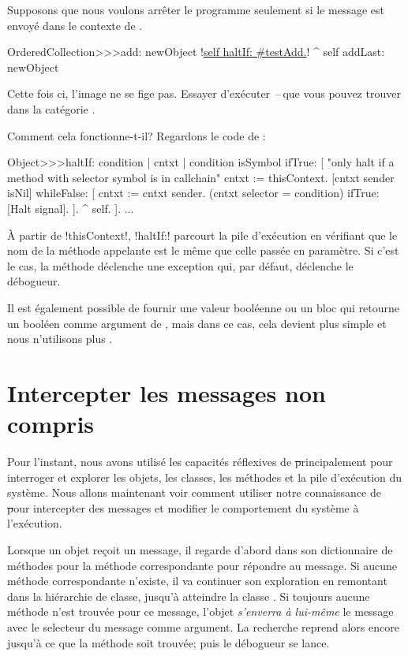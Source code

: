 \documentclass[a4paper,10pt,twoside]{book}
\begin{document}
Supposons que nous voulons arrêter le programme seulement si le message  est envoyé dans le contexte de .

\begin{code}{}
OrderedCollection>>>add: newObject
	!\underline{self haltIf: \#testAdd.}!
	^ self addLast: newObject
\end{code}

Cette fois ci, l'image ne se fige pas. Essayer d'exécuter \,--\,que vous pouvez trouver dans la catégorie \mbox{.}

Comment cela fonctionne-t-il? Regardons le code de \mbox{:}
\begin{code}{}
Object>>>haltIf: condition
	| cntxt |
	condition isSymbol ifTrue: [
		"only halt if a method with selector symbol is in callchain"
		cntxt := thisContext.
		[cntxt sender isNil] whileFalse: [
			cntxt := cntxt sender. 
			(cntxt selector = condition) ifTrue: [Halt signal]. ].
		^ self.
	].
	...
\end{code}

À partir de \ct!thisContext!, \ct!haltIf:! parcourt la pile d'exécution en vérifiant que le nom de la méthode appelante est le même que celle passée en paramètre. Si c'est le cas, la méthode déclenche une exception qui, par défaut, déclenche le débogueur.

Il est également possible de fournir une valeur booléenne ou un bloc qui retourne un booléen comme argument de , mais dans ce cas, cela devient plus simple et nous n'utilisons plus .

\section{Intercepter les messages non compris}

Pour l'instant, nous avons utilisé les capacités réflexives de \st principalement pour interroger et explorer les objets, les classes, les méthodes et la pile d'exécution du système. Nous allons maintenant voir comment utiliser notre connaissance de \st pour intercepter des messages et modifier le comportement du système à l'exécution.

Lorsque un objet reçoit un message, il regarde d'abord dans son dictionnaire de méthodes pour la méthode correspondante pour répondre au message.
Si aucune méthode correspondante n'existe, il va continuer son exploration en remontant dans la hiérarchie de classe, jusqu'à atteindre la classe .
Si toujours aucune méthode n'est trouvée pour ce message, l'objet \emph{s'enverra à lui-même} %
le message  avec le selecteur du message comme argument.
La recherche reprend alors encore jusqu'à ce que la méthode
 soit trouvée; puis le débogueur se lance.
\end{document}

